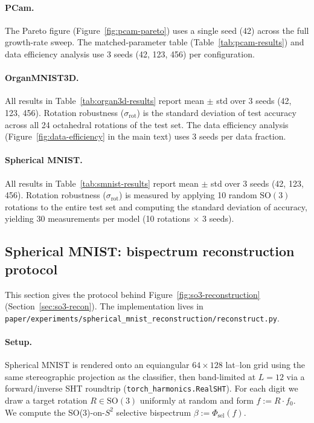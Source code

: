 \documentclass{article}
\theoremstyle{definition}
\theoremstyle{remark}
\newcommand{\SO}{\mathrm{SO}}
\theoremstyle{definition}
\begin{document}
\paragraph{PCam.}
The Pareto figure (Figure~\ref{fig:pcam-pareto}) uses a single seed
(42) across the full growth-rate sweep. The matched-parameter table
(Table~\ref{tab:pcam-results}) and data efficiency analysis use 3 seeds
(42, 123, 456) per configuration.

\paragraph{OrganMNIST3D.}
All results in Table~\ref{tab:organ3d-results} report mean $\pm$ std
over 3 seeds (42, 123, 456). Rotation robustness
($\sigma_{\mathrm{rot}}$) is the standard deviation of test accuracy
across all 24 octahedral rotations of the test set. The data
efficiency analysis (Figure~\ref{fig:data-efficiency} in the main text) uses 3 seeds per data
fraction.

\paragraph{Spherical MNIST.}
All results in Table~\ref{tab:smnist-results} report mean $\pm$ std
over 3 seeds (42, 123, 456). Rotation robustness
($\sigma_{\mathrm{rot}}$) is measured by applying 10 random $\SO(3)$
rotations to the entire test set and computing the standard deviation
of accuracy, yielding 30 measurements per model (10 rotations
$\times$ 3 seeds).

\subsection{Spherical MNIST: bispectrum reconstruction protocol}
\label{app:so3-recon}

This section gives the protocol behind
Figure~\ref{fig:so3-reconstruction} (Section~\ref{sec:so3-recon}).
The implementation lives in
\texttt{paper/experiments/spherical\_mnist\_reconstruction/reconstruct.py}.

\paragraph{Setup.}
Spherical MNIST is rendered onto an equiangular $64{\times}128$
lat--lon grid using the same stereographic projection as the
classifier, then band-limited at $L = 12$ via a forward/inverse SHT
roundtrip (\texttt{torch\_harmonics.RealSHT}). For each digit we
draw a target rotation $R\in\SO(3)$ uniformly at random and form
$f := R\cdot f_0$. We compute the SO(3)-on-$S^2$ selective bispectrum
$\beta := \Phi_{\mathrm{sel}}(f)$.
\end{document}
